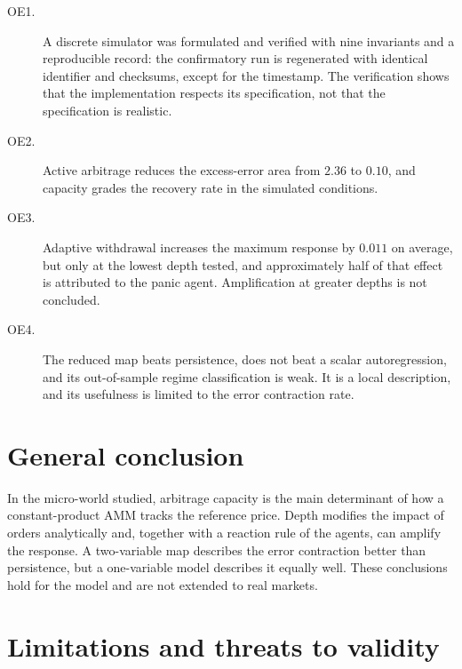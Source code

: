 \begin{description}
  \item[OE1.] A discrete simulator was formulated and verified with nine invariants and a reproducible record: the confirmatory run is regenerated with identical identifier and checksums, except for the timestamp. The verification shows that the implementation respects its specification, not that the specification is realistic.
  \item[OE2.] Active arbitrage reduces the excess-error area from $2.36$ to $0.10$, and capacity grades the recovery rate in the simulated conditions.
  \item[OE3.] Adaptive withdrawal increases the maximum response by $0.011$ on average, but only at the lowest depth tested, and approximately half of that effect is attributed to the panic agent. Amplification at greater depths is not concluded.
  \item[OE4.] The reduced map beats persistence, does not beat a scalar autoregression, and its out-of-sample regime classification is weak. It is a local description, and its usefulness is limited to the error contraction rate.
\end{description}

\section{General conclusion}

In the micro-world studied, arbitrage capacity is the main determinant of how a constant-product AMM tracks the reference price. Depth modifies the impact of orders analytically and, together with a reaction rule of the agents, can amplify the response. A two-variable map describes the error contraction better than persistence, but a one-variable model describes it equally well. These conclusions hold for the model and are not extended to real markets.

\section{Limitations and threats to validity}


